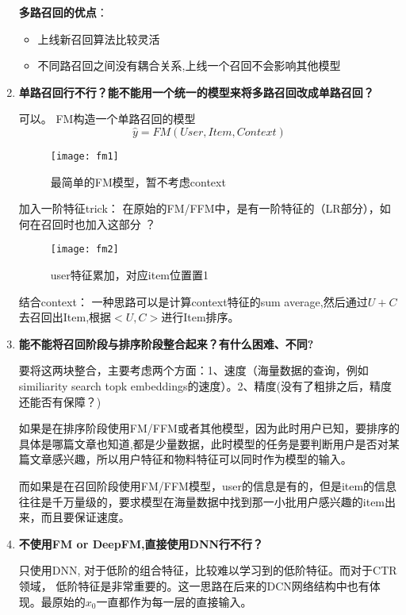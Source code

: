 \documentclass{article}
\begin{document}
\begin{CJK*}{UTF8}{gbsn}
\begin{enumerate}
\textbf{多路召回的优点}：
\begin{itemize}
\item 上线新召回算法比较灵活
\item 不同路召回之间没有耦合关系,上线一个召回不会影响其他模型
\end{itemize}

\item \textbf{ 单路召回行不行？能不能用一个统一的模型来将多路召回改成单路召回？}

可以。 FM构造一个单路召回的模型
$$\widehat{y}=FM(User,Item,Context)$$

\begin{figure}[H]
\centering
\texttt{[image: fm1]}
\caption{最简单的FM模型，暂不考虑context}
\end{figure}
加入一阶特征trick： 在原始的FM/FFM中，是有一阶特征的（LR部分），如何在召回时也加入这部分 ？
\begin{figure}[H]
\centering
\texttt{[image: fm2]}
\caption{user特征累加，对应item位置置1}
\end{figure}

结合context： 一种思路可以是计算context特征的sum average,然后通过$U+C$去召回出Item,根据$<U,C>$进行Item排序。
\item \textbf{能不能将召回阶段与排序阶段整合起来？有什么困难、不同?}

要将这两块整合，主要考虑两个方面：1、速度（海量数据的查询，例如 similiarity search topk embeddings的速度）。2、精度(没有了粗排之后，精度还能否有保障？)

如果是在排序阶段使用FM/FFM或者其他模型，因为此时用户已知，要排序的具体是哪篇文章也知道,都是少量数据，此时模型的任务是要判断用户是否对某篇文章感兴趣，所以用户特征和物料特征可以同时作为模型的输入。

而如果是在召回阶段使用FM/FFM模型，user的信息是有的，但是item的信息往往是千万量级的，要求模型在海量数据中找到那一小批用户感兴趣的item出来，而且要保证速度。

\item \textbf{不使用FM or DeepFM,直接使用DNN行不行？}

只使用DNN, 对于低阶的组合特征，比较难以学习到的低阶特征。而对于CTR领域， 低阶特征是非常重要的。这一思路在后来的DCN网络结构中也有体现。最原始的$x_{0}$一直都作为每一层的直接输入。
\end{enumerate}




\end{CJK*}
\end{document}
